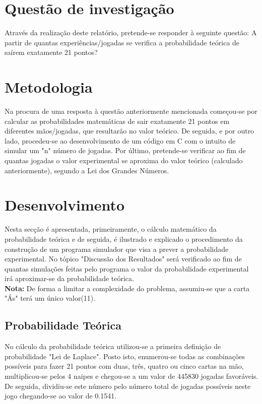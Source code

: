 \documentclass{report}
\begin{document}
\chapter{Questão de investigação}
\label{chap.Questão de investigação}
Através da realização deste relatório, pretende-se responder à seguinte questão: A partir de quantas experiências/jogadas se verifica a probabilidade teórica de saírem exatamente 21 pontos? 

\chapter{Metodologia}
\label{chap.Metodologia}
Na procura de uma resposta à questão anteriormente mencionada começou-se por calcular as probabilidades matemáticas de sair exatamente 21 pontos em diferentes mãos/jogadas, que resultarão no valor teórico. De seguida, e por outro lado, procedeu-se ao desenvolvimento de um código em C com o intuito de simular um "n" número de jogadas. Por último, pretende-se verificar ao fim de quantas jogadas o valor experimental se aproxima do valor teórico (calculado anteriormente), segundo a Lei dos Grandes Números.

\chapter{Desenvolvimento}
\label{chap.Desenvolvimento}
Nesta secção é apresentada, primeiramente, o cálculo matemático da probabilidade teórica e de seguida, é ilustrado e explicado o procedimento da construção de um programa simulador que visa a prever a probabilidade experimental. No tópico "Discussão dos Resultados" será verificado ao fim de quantas simulações feitas pelo programa o valor da probabilidade experimental irá aproximar-se da probabilidade teórica.\\\textbf{Nota:} De forma a limitar a complexidade do problema, assumiu-se que a carta "Ás" terá um único valor(11).

\section{Probabilidade Teórica}
No cálculo da probabilidade teórica utilizou-se a primeira definição de probabilidade "Lei de Laplace". Posto isto, enumerou-se todas as combinações possíveis para fazer 21 pontos com duas, três, quatro ou cinco cartas na mão, multiplicou-se pelos 4 naipes e chegou-se a um valor de 445830 jogadas favoráveis. De seguida, dividiu-se este número pelo número total de jogadas possíveis neste jogo chegando-se ao valor de 0.1541.
\end{document}
